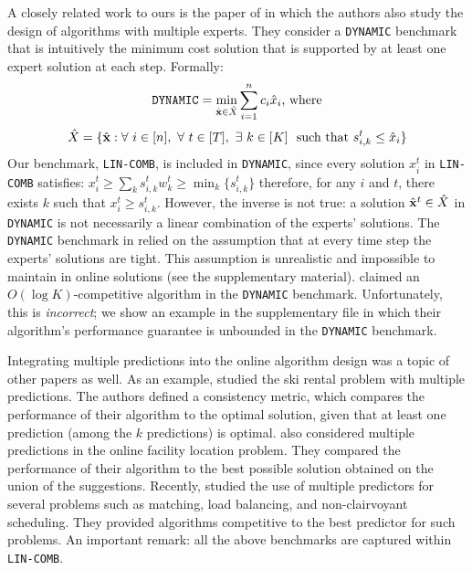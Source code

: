 A closely related work to ours is the paper of \cite{AnandGe22:Online-Algorithms} in which the authors also study the design of algorithms with multiple experts.
They consider a \texttt{DYNAMIC} benchmark that is intuitively
the minimum cost solution that is supported by at least one expert solution at each step. Formally:
\[\texttt{DYNAMIC} = \min_{\hat{\textbf{x}} \in \hat{X}} \sum_{i=1}^{n} c_i \hat{x}_i \textnormal{, where}\]
%
\[\hat{X} = \{\hat{\mathbf{x}} : \forall\ i \in [n],\ \forall\ t \in [T],\ \exists\ k \in [K]\ \textnormal{ such that } s_{i,k}^{t} \le \hat{x}_i \}\]
%
Our benchmark, \texttt{LIN-COMB}, is included in \texttt{DYNAMIC}, since every solution $x_{i}^{t}$ in \texttt{LIN-COMB} satisfies:
$
	x_{i}^{t} \geq \sum_{k} s_{i,k}^{t}w_{k}^{t} \geq \min_{k} \{s_{i,k}^{t}\}
$
therefore, for any $i$ and $t$, there exists $k$ such that $x_{i}^{t} \geq s_{i,k}^{t}$.
However, the inverse is not true: a solution $\hat{\mathbf{x}}^{t} \in \hat{X}$ in \texttt{DYNAMIC} is not necessarily
a linear combination of the experts' solutions.
The \texttt{DYNAMIC} benchmark in \cite{AnandGe22:Online-Algorithms} relied on the assumption that at every time step
the experts' solutions are tight. This assumption is unrealistic and impossible to maintain in online solutions (see the supplementary material).
\cite{AnandGe22:Online-Algorithms} claimed an $O(\log K)$-competitive algorithm in the \texttt{DYNAMIC} benchmark.
Unfortunately, this is \emph{incorrect}; we show an example in the supplementary file
in which their algorithm's performance guarantee is unbounded in the \texttt{DYNAMIC}
benchmark.


Integrating multiple predictions into the online algorithm design was a topic of other papers as well.
As an example, \cite{GollapudiPanigrahi19:skirental-multiple-predictions} studied the ski rental problem with multiple predictions.
The authors defined a consistency metric, which compares the performance of their algorithm to the optimal solution, given that at least one prediction (among the $k$ predictions) is optimal.
\cite{AlmanzaChierichetti21:Online-Facility} also considered multiple predictions in the online facility location problem.
They compared the performance of their algorithm to the best possible solution obtained on the union of the suggestions. Recently, \cite{DinitzIm:Algorithms-with} studied the use of multiple predictors for several problems such as matching, load balancing, and non-clairvoyant scheduling. They provided algorithms competitive to the best predictor for such problems.
An important remark: all the above benchmarks are captured within \texttt{LIN-COMB}.

